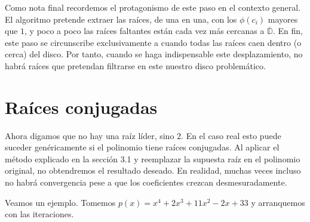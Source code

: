\documentclass[oneside,11pt]{book}
\theoremstyle{definition}
\theoremstyle{plain}
\theoremstyle{remark}
\begin{document}
Como nota final recordemos el protagonismo de este paso en el contexto general. 
El algoritmo pretende extraer las ra\'ices, de una en una,  con los $\phi(c_i)$ mayores que $1$, 
y poco a poco las ra\'ices faltantes est\'an cada vez m\'as cercanas a $\overline{\mathbb{D}}$.
En fin, este paso se circunscribe exclusivamente a cuando todas las ra\'ices caen dentro (o cerca) del disco.
Por tanto, cuando se haga indispensable este desplazamiento, 
no habr\'a ra\'ices que pretendan filtrarse en este nuestro disco problem\'atico.  
\medskip

\section{Ra\'ices conjugadas}

Ahora digamos que no hay una ra\'iz l\'ider, sino $2$. 
En el caso real esto puede suceder gen\'ericamente si el polinomio tiene ra\'ices conjugadas.
Al aplicar el m\'etodo explicado en la secci\'on 3.1 y 
reemplazar la supuesta ra\'iz en el polinomio original, 
no obtendremos el resultado deseado.
En realidad, muchas veces incluso no habr\'a convergencia pese a que los coeficientes 
crezcan desmesuradamente. 

Veamos un ejemplo. 
Tomemos $p(x) = x^4+2x^3+11x^2-2x+33$ y arranquemos con las iteraciones.
 
\end{document}
